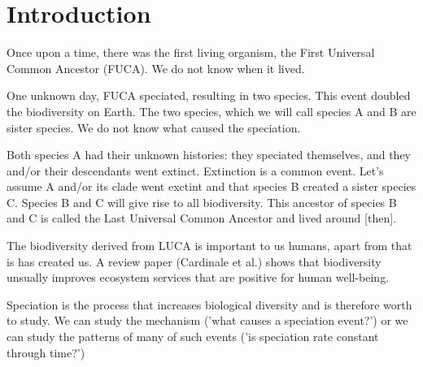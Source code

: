 \chapter{Introduction}
\label{chapter_introduction}
\newpage

\noindent

Once upon a time, there was the first living organism, the 
First Universal Common Ancestor (FUCA).
We do not know when it lived.

% 
%

One unknown day, FUCA speciated, resulting in two species.
This event doubled the biodiversity on Earth.
The two species, which we will call species A and B
are sister species.
We do not know what caused the speciation.

%

Both species A had their unknown histories: they speciated themselves,
and they and/or their descendants went extinct. 
Extinction is a common event. Let's assume A and/or its clade went
exctint and that species B created a sister species C. Species B
and C will give rise to all biodiversity. This ancestor of species B and C 
is called the Last Universal Common Ancestor and lived around [then].

            
%

The biodiversity derived from LUCA is important to us humans, 
apart from
that is has created us. A review paper (Cardinale et al.) shows that 
biodiversity unsually improves ecosystem services that are 
positive for human well-being.

%
%
%
%

Speciation is the process that increases biological diversity 
and is therefore worth to study. We can study the mechanism ('what
causes a speciation event?') or we can study the patterns of many
of such events ('is speciation rate constant through time?')
%
%

